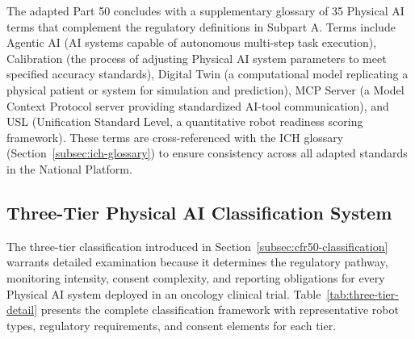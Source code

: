 The adapted Part 50 concludes with a supplementary glossary of 35 Physical AI
terms that complement the regulatory definitions in Subpart A. Terms include
Agentic AI (AI systems capable of autonomous multi-step task execution),
Calibration (the process of adjusting Physical AI system parameters to meet
specified accuracy standards), Digital Twin (a computational model replicating a
physical patient or system for simulation and prediction), MCP Server (a Model
Context Protocol server providing standardized AI-tool communication), and USL
(Unification Standard Level, a quantitative robot readiness scoring framework).
These terms are cross-referenced with the ICH glossary
(Section~\ref{subsec:ich-glossary}) to ensure consistency across all adapted
standards in the National Platform.

\subsection{Three-Tier Physical AI Classification System}
\label{subsec:cfr50-three-tier}

The three-tier classification introduced in
Section~\ref{subsec:cfr50-classification} warrants detailed examination because
it determines the regulatory pathway, monitoring intensity, consent complexity,
and reporting obligations for every Physical AI system deployed in an oncology
clinical trial. Table~\ref{tab:three-tier-detail} presents the complete
classification framework with representative robot types, regulatory
requirements, and consent elements for each tier.

\clearpage


